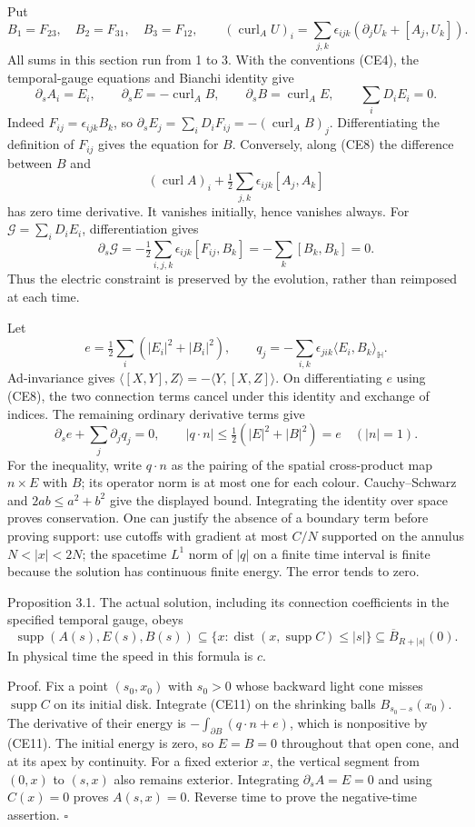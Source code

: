 \documentclass[11pt]{article}
\begin{document}
Put
\[
 B_1=F_{23},\quad B_2=F_{31},\quad B_3=F_{12},\qquad
 (\operatorname{curl}_A U)_i
 =\sum_{j,k}\epsilon_{ijk}(\partial_jU_k+[A_j,U_k]).
\]
All sums in this section run from 1 to 3. With the conventions (CE4),
the temporal-gauge equations and Bianchi identity give
\[
 \partial_sA_i=E_i,\qquad
 \partial_s E=-\operatorname{curl}_A B,\qquad
 \partial_s B=\operatorname{curl}_A E,\qquad
 \sum_iD_iE_i=0.
 \tag{CE8}
\]
Indeed \(F_{ij}=\epsilon_{ijk}B_k\), so
\(\partial_sE_j=\sum_iD_iF_{ij}=-(\operatorname{curl}_AB)_j\).
Differentiating the definition of \(F_{ij}\) gives the equation for \(B\).
Conversely, along (CE8) the difference between \(B\) and
\[
 (\operatorname{curl}A)_i+\tfrac12
             \sum_{j,k}\epsilon_{ijk}[A_j,A_k]
\]
has zero time derivative. It vanishes initially, hence vanishes always.
For \(\mathcal G=\sum_iD_iE_i\), differentiation gives
\[
 \partial_s\mathcal G
 =-\tfrac12\sum_{i,j,k}\epsilon_{ijk}[F_{ij},B_k]
 =-\sum_k[B_k,B_k]=0.
 \tag{CE9}
\]
Thus the electric constraint is preserved by the evolution, rather
than reimposed at each time.

Let
\[
 e=\tfrac12\sum_i(|E_i|^2+|B_i|^2),\qquad
 q_j=-\sum_{i,k}\epsilon_{jik}\langle E_i,B_k\rangle_{\mathbb H}.
 \tag{CE10}
\]
Ad-invariance gives
\(\langle[X,Y],Z\rangle=-\langle Y,[X,Z]\rangle\).
On differentiating \(e\) using (CE8), the two connection terms cancel
under this identity and exchange of indices. The remaining ordinary
derivative terms give
\[
 \partial_se+\sum_j\partial_jq_j=0,\qquad
 |q\cdot n|\leq \tfrac12(|E|^2+|B|^2)=e
 \quad(|n|=1).
 \tag{CE11}
\]
For the inequality, write \(q\cdot n\) as the pairing of the spatial
cross-product map \(n\times E\) with \(B\); its operator norm is at most
one for each colour. Cauchy–Schwarz and \(2ab\leq a^2+b^2\) give the
displayed bound. Integrating the identity over space proves conservation.
One can justify the absence of a boundary term before proving support:
use cutoffs with gradient at most \(C/N\) supported on the annulus
\(N<|x|<2N\); the spacetime \(L^1\) norm of \(|q|\) on a finite time
interval is finite because the solution has continuous finite energy.
The error tends to zero.

Proposition 3.1. The actual solution, including its connection
coefficients in the specified temporal gauge, obeys
\[
 \operatorname{supp}(A(s),E(s),B(s))
 \subseteq\{x:\operatorname{dist}(x,\operatorname{supp}C)\leq |s|\}
 \subseteq\overline B_{R+|s|}(0).
 \tag{CE12}
\]
In physical time the speed in this formula is \(c\).

Proof. Fix a point \((s_0,x_0)\) with \(s_0>0\) whose backward
light cone misses \(\operatorname{supp}C\) on its initial disk.
Integrate (CE11) on the shrinking balls
\(B_{s_0-s}(x_0)\). The derivative of their energy is
\(-\int_{\partial B}(q\cdot n+e)\), which is nonpositive by (CE11).
The initial energy is zero, so \(E=B=0\) throughout that open cone,
and at its apex by continuity. For a fixed exterior \(x\), the vertical
segment from \((0,x)\) to \((s,x)\) also remains exterior. Integrating
\(\partial_sA=E=0\) and using \(C(x)=0\) proves \(A(s,x)=0\).
Reverse time to prove the negative-time assertion. \(\square\)
\end{document}
